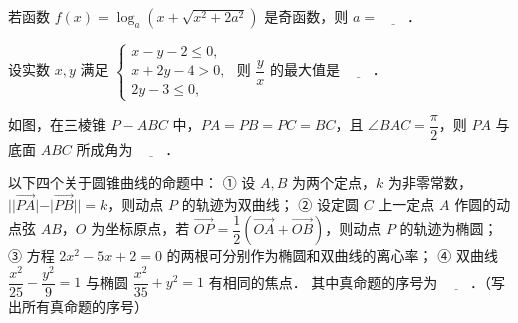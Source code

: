 \begin{question}
若函数 $f(x) = \log_a(x + \sqrt{x^2 + 2a^2})$ 是奇函数，则 $a = \underline{\hspace{2em}}$．

\end{question}
\begin{question}
设实数 $x, y$ 满足 $\begin{cases} x - y - 2 \leqslant 0, \\ x + 2y - 4 > 0, \\ 2y - 3 \leqslant 0, \end{cases}$ 则 $\dfrac{y}{x}$ 的最大值是 $\underline{\hspace{2em}}$．

\Needspace{0.4\textheight}
\end{question}
\begin{question}
如图，在三棱锥 $P - ABC$ 中，$PA = PB = PC = BC$，且 $\angle BAC = \dfrac{\pi}{2}$，则 $PA$ 与底面 $ABC$ 所成角为 $\underline{\hspace{2em}}$．
\nopagebreak[4]
\begin{center}\end{center}
\nopagebreak[4]
\end{question}
\begin{question}
以下四个关于圆锥曲线的命题中：
① 设 $A, B$ 为两个定点，$k$ 为非零常数，$||\vec{PA}| - |\vec{PB}|| = k$，则动点 $P$ 的轨迹为双曲线；
② 设定圆 $C$ 上一定点 $A$ 作圆的动点弦 $AB$，$O$ 为坐标原点，若 $\vec{OP} = \dfrac{1}{2}(\vec{OA} + \vec{OB})$，则动点 $P$ 的轨迹为椭圆；
③ 方程 $2x^2 - 5x + 2 = 0$ 的两根可分别作为椭圆和双曲线的离心率；
④ 双曲线 $\dfrac{x^2}{25} - \dfrac{y^2}{9} = 1$ 与椭圆 $\dfrac{x^2}{35} + y^2 = 1$ 有相同的焦点．
其中真命题的序号为 $\underline{\hspace{2em}}$．（写出所有真命题的序号）

\end{question}

